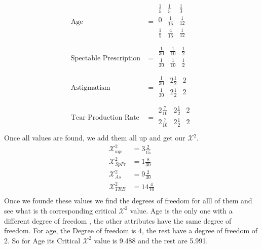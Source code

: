\documentclass[12pt,english]{article}
\begin{document}
\begin{equation}\tag{3}\label{eq:3}
\begin{split}
\mbox{Age} &=
\begin{array}{|ccc|}
\frac{1}{5} & \frac{1}{5}  & \frac{1}{3} \\
\hline
0           & \frac{1}{15} & \frac{1}{12} \\
\hline
\frac{1}{5} & \frac{4}{15} & \frac{1}{12} \\
\end{array}
\\
\mbox{Spectable Prescription} &=
\begin{array}{|ccc|}
\frac{1}{30} & \frac{1}{10} & \frac{1}{2} \\
\hline
\frac{1}{30} & \frac{1}{10} & \frac{1}{2} \\
\end{array}
\\
\mbox{Astigmatism} &=
\begin{array}{|ccc|}
\frac{1}{30} & 2\frac{1}{2} & 2 \\
\hline
\frac{1}{30} & 2\frac{1}{2} & 2 \\
\end{array}
\\
\mbox{Tear Production Rate} &=
\begin{array}{|ccc|}
2\frac{7}{10} & 2\frac{1}{2} & 2 \\
\hline
2\frac{7}{10} & 2\frac{1}{2} & 2 \\
\end{array}
\end{split}
\end{equation}
Once all values are found, we add them all up and get our $\mathcal{X}^2$.
\begin{equation}\tag{4}\label{eq:4}
\begin{split}
\mathcal{X}^{2}_{age} &= 3\frac{2}{15}\\
\mathcal{X}^{2}_{SpPr} &= 1\frac{8}{30}\\
\mathcal{X}^{2}_{As} &= 9\frac{2}{30}\\
\mathcal{X}^{2}_{TRB} &= 14\frac{4}{10}\\
\end{split}
\end{equation}
Once we founde these values we find the degrees of freedom for alll of them and see what is th corresponding critical $\mathcal{X}^2$ value. Age is the only one with a different degree of freedom , the other attributes have the same degree of freedom. For age, the Degree of freedom is 4, the rest have  a degree of freedom of 2. So for Age its Critical $\mathcal{X}^2$ value is 9.488 and the rest are 5.991.\\
\end{document}
